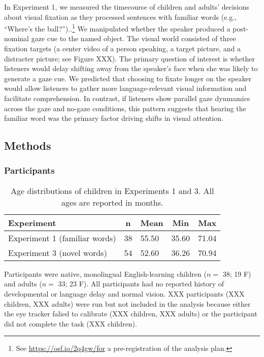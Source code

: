 \documentclass[man,floatsintext]{apa6}
\let\rmarkdownfootnote\footnote%
\def\footnote{\protect\rmarkdownfootnote}
\begin{document}
In Experiment 1, we measured the timecourse of children and adults'
decisions about visual fixation as they processed sentences with
familiar words (e.g., \enquote{Where's the ball?})..\footnote{See
  \url{https://osf.io/2q4gw/for} a pre-registration of the analysis
  plan.} We manipulated whether the speaker produced a post-nominal gaze
cue to the named object. The visual world consisted of three fixation
targets (a center video of a person speaking, a target picture, and a
distracter picture; see Figure XXX). The primary question of interest is
whether listeners would delay shifting away from the speaker's face when
she was likely to generate a gaze cue. We predicted that choosing to
fixate longer on the speaker would allow listeners to gather more
language-relevant visual information and facilitate comprehension. In
contrast, if listeners show parallel gaze dynmamics across the gaze and
no-gaze conditions, this pattern suggests that hearing the familiar word
was the primary factor driving shifts in visual attention.

\subsection{Methods}\label{methods}

\subsubsection{Participants}\label{participants}

\begin{table}[tbp]
\begin{center}
\begin{threeparttable}
\caption{\label{tab:make-ss-table}Age distributions of children in Experiments 1 and 3. All ages are reported in months.}
\begin{tabular}{lllll}
\toprule
Experiment & \multicolumn{1}{c}{n} & \multicolumn{1}{c}{Mean} & \multicolumn{1}{c}{Min} & \multicolumn{1}{c}{Max}\\
\midrule
Experiment 1 (familiar words) & 38 & 55.50 & 35.60 & 71.04\\
Experiment 3 (novel words) & 54 & 52.60 & 36.26 & 70.94\\
\bottomrule
\end{tabular}
\end{threeparttable}
\end{center}
\end{table}

Participants were native, monolingual English-learning children (\(n=\)
38; 19 F) and adults (\(n=\) 33; 23 F). All participants had no reported
history of developmental or language delay and normal vision. XXX
participants (XXX children, XXX adults) were run but not included in the
analysis because either the eye tracker falied to calibrate (XXX
children, XXX adults) or the participant did not complete the task (XXX
children).
\end{document}
